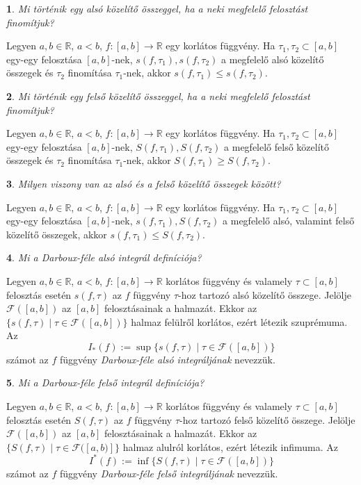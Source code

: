 \documentclass[a4paper]{article}
\def\R{\mathbb{R}}
\theoremstyle{qstyle}
\newtheorem{question}{}{}
\begin{document}
	\begin{question}
		Mi történik egy alsó közelítő összeggel, ha a neki megfelelő felosztást finomítjuk?
	\end{question}
	Legyen $a,b \in \R$, $a < b$, $f : [a,b] \to \R$ egy korlátos függvény. Ha $\tau_1, \tau_2 \subset [a,b]$ egy-egy felosztása $[a,b]$-nek, $s(f,\tau_1), s(f,\tau_2)$ a megfelelő alsó közelítő összegek és $\tau_2$ finomítása $\tau_1$-nek, akkor $s(f,\tau_1) \leq s(f,\tau_2)$.   
	
	\begin{question}
		Mi történik egy felső közelítő összeggel, ha a neki megfelelő felosztást finomítjuk?
	\end{question}
	Legyen $a,b \in \R$, $a < b$, $f : [a,b] \to \R$ egy korlátos függvény. Ha $\tau_1, \tau_2 \subset [a,b]$ egy-egy felosztása $[a,b]$-nek, $S(f,\tau_1), S(f,\tau_2)$ a megfelelő felső közelítő összegek és $\tau_2$ finomítása $\tau_1$-nek, akkor $S(f,\tau_1) \geq S(f,\tau_2)$. 
	
	\begin{question}
		Milyen viszony van az alsó és a felső közelítő összegek között?
	\end{question}
	Legyen $a,b \in \R$, $a < b$, $f : [a,b] \to \R$ egy korlátos függvény. Ha $\tau_1, \tau_2 \subset [a,b]$ egy-egy felosztása $[a,b]$-nek, $s(f,\tau_1), S(f,\tau_2)$ a megfelelő alsó, valamint felső közelítő összegek, akkor $s(f,\tau_1) \leq S(f,\tau_2)$.
	
	\begin{question}
		Mi a \emph{Darboux-féle alsó integrál} definíciója?
	\end{question}
	Legyen $a,b \in \R$, $a<b$, $f:[a,b] \to \R$ korlátos függvény és valamely $\tau \subset [a,b]$ felosztás esetén $s(f,\tau)$ az $f$ függvény $\tau$-hoz tartozó alsó közelítő összege. Jelölje $\mathcal{F}([a,b])$ az $[a,b]$ felosztásainak a halmazát. Ekkor az $\{s(f,\tau) \mid \tau\in \mathcal{F}([a,b])\}$ halmaz felülről korlátos, ezért létezik szuprémuma. Az
	$$I_*(f) := \sup \{s(f,\tau) \mid \tau \in \mathcal{F}([a,b])\} $$
	számot az $f$ függvény \emph{Darboux-féle alsó integráljának} nevezzük.
	
	\begin{question}
		Mi a \emph{Darboux-féle felső integrál} definíciója?
	\end{question}
	Legyen $a,b \in \R$, $a<b$, $f:[a,b] \to \R$ korlátos függvény és valamely $\tau \subset [a,b]$ felosztás esetén $S(f,\tau)$ az $f$ függvény $\tau$-hoz tartozó felső közelítő összege. Jelölje $\mathcal{F}([a,b])$ az $[a,b]$ felosztásainak a halmazát. Ekkor az $\{S(f,\tau) \mid \tau\in \mathcal{F}([a,b)]\}$ halmaz alulról korlátos, ezért létezik infimuma. Az
	$$I^{*}(f) := \inf \{S(f,\tau) \mid \tau \in \mathcal{F}([a,b])\} $$
	számot az $f$ függvény \emph{Darboux-féle felső integráljának} nevezzük.
	
\end{document}
